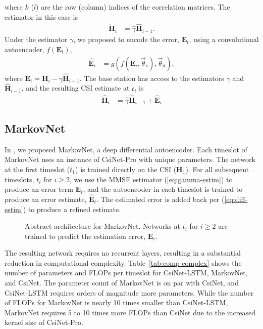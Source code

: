 where $k$ ($l$) are the row (column) indices of the correlation matrices. The estimator in this case is 
\begin{align}
	\grave{\mathbf H}_i &= \hat\gamma \hat{\mathbf H}_{i-1} \label{eq:gamma-estim}.
\end{align}
Under the estimator $\gamma$, we proposed to encode the error, $\mathbf E_t$, using a convolutional autoencoder, $f(\mathbf E_t)$,
\begin{align*}
	\hat{\mathbf E}_i &= g(f(\mathbf E_i, \vec\theta_e), \vec\theta_d),
\end{align*}
where $\mathbf E_i = \mathbf H_i - \gamma\hat{\mathbf H}_{i-1}$. The base station has access to the estimators $\gamma$ and $\hat{\mathbf H}_{i-1}$, and the resulting CSI estimate at $t_i$ is
\begin{align}
	\hat{\mathbf H}_i &= \hat\gamma \hat{\mathbf H}_{i-1} + \hat{\mathbf{E}}_i \label{eq:diff-estim}
\end{align}

\subsection{MarkovNet}

In \cite{ref:Liu2020MarkovNet}, we proposed MarkovNet, a deep differential autoencoder. Each timeslot of MarkovNet uses an instance of CsiNet-Pro with unique parameters. The network at the first timeslot ($t_1$) is trained directly on the CSI ($\mathbf H_1$). For all subsequent timeslots, $t_i$ for $i \geq 2$, we use the MMSE estimator (\ref{eq:gamma-estim}) to produce an error term $\mathbf E_t$, and the autoencoder in each timeslot is trained to produce an error estimate, $\hat{\mathbf E}_t$. The estimated error is added back per (\ref{eq:diff-estim}) to produce a refined estimate.

\begin{figure}[!hbtp]
    \centering
    {
      \fontsize{6pt}{8pt}
      \def\svgwidth{0.8\columnwidth}
      
    }
    \caption{Abstract architecture for MarkovNet. Networks at $t_i$ for $i \geq 2$ are trained to predict the estimation error, $\mathbf E_i$.}
    \label{fig:markovnet_schema}
\end{figure}

The resulting network requires no recurrent layers, resulting in a substantial reduction in computational complexity. Table~\ref{tab:comp-complex} shows the number of parameters and FLOPs per timeslot for CsiNet-LSTM, MarkovNet, and CsiNet. The parameter count of MarkovNet is on par with CsiNet, and CsiNet-LSTM requires orders of magnitude more parameters. While the number of FLOPs for MarkovNet is nearly 10 times smaller than CsiNet-LSTM, MarkovNet requires 5 to 10 times more FLOPs than CsiNet due to the increased kernel size of CsiNet-Pro.


